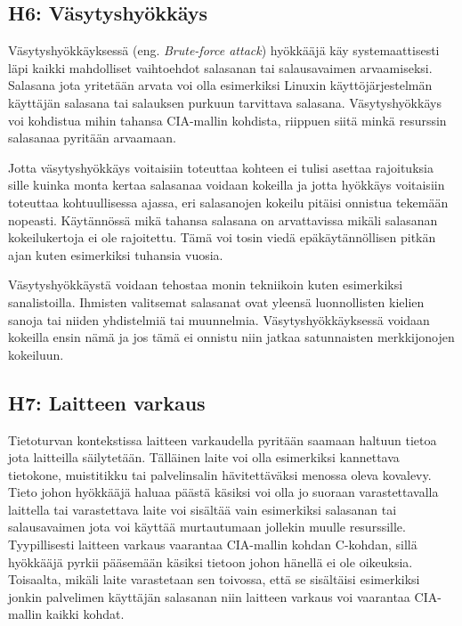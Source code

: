 \subsection{H6: Väsytyshyökkäys}
Väsytyshyökkäyksessä (eng. \textit{Brute-force attack}) hyökkääjä käy systemaattisesti läpi kaikki mahdolliset vaihtoehdot salasanan tai salausavaimen arvaamiseksi. Salasana jota yritetään arvata voi olla esimerkiksi Linuxin käyttöjärjestelmän käyttäjän salasana tai salauksen purkuun tarvittava salasana. Väsytyshyökkäys voi kohdistua mihin tahansa CIA-mallin kohdista, riippuen siitä minkä resurssin salasanaa pyritään arvaamaan.

Jotta väsytyshyökkäys voitaisiin toteuttaa kohteen ei tulisi asettaa rajoituksia sille kuinka monta kertaa salasanaa voidaan kokeilla ja jotta hyökkäys voitaisiin toteuttaa kohtuullisessa ajassa, eri salasanojen kokeilu pitäisi onnistua tekemään nopeasti. Käytännössä mikä tahansa salasana on arvattavissa mikäli salasanan kokeilukertoja ei ole rajoitettu. Tämä voi tosin viedä epäkäytännöllisen pitkän ajan kuten esimerkiksi tuhansia vuosia.

Väsytyshyökkäystä voidaan tehostaa monin tekniikoin kuten esimerkiksi sanalistoilla. Ihmisten valitsemat salasanat ovat yleensä luonnollisten kielien sanoja tai niiden yhdistelmiä tai muunnelmia. Väsytyshyökkäyksessä voidaan kokeilla ensin nämä ja jos tämä ei onnistu niin jatkaa satunnaisten merkkijonojen kokeiluun.~\cite{beaver2015hacking}

\subsection{H7: Laitteen varkaus}
Tietoturvan kontekstissa laitteen varkaudella pyritään saamaan haltuun tietoa jota laitteilla säilytetään. Tälläinen laite voi olla esimerkiksi kannettava tietokone, muistitikku tai palvelinsalin hävitettäväksi menossa oleva kovalevy. Tieto johon hyökkääjä haluaa päästä käsiksi voi olla jo suoraan varastettavalla laittella tai varastettava laite voi sisältää vain esimerkiksi salasanan tai salausavaimen jota voi käyttää murtautumaan jollekin muulle resurssille. Tyypillisesti laitteen varkaus vaarantaa CIA-mallin kohdan C-kohdan, sillä hyökkääjä pyrkii pääsemään käsiksi tietoon johon hänellä ei ole oikeuksia. Toisaalta, mikäli laite varastetaan sen toivossa, että se sisältäisi esimerkiksi jonkin palvelimen käyttäjän salasanan niin laitteen varkaus voi vaarantaa CIA-mallin kaikki kohdat.~\cite{beaver2015hacking}
